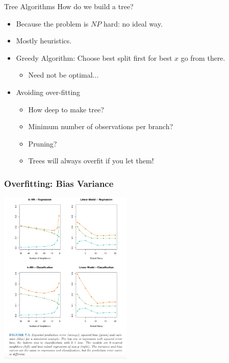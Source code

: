 \documentclass[xcolor=pdftex,dvipsnames,table,mathserif,aspectratio=169]{beamer}
\begin{document}
\begin{frame}{Tree Algorithms}
How do we build a tree?
\begin{itemize}
\item Because the problem is $NP$ hard: no ideal way.
\item Mostly heuristics.
\item Greedy Algorithm: Choose best split first for best $x$ go from there.
\begin{itemize}
\item Need not be optimal...
\end{itemize}
\item Avoiding \alert{over-fitting}
\begin{itemize}
\item How deep to make tree?
\item Minimum number of observations per branch?
\item Pruning?
\item Trees will always overfit if you let them!
\end{itemize}
\end{itemize}
\end{frame}


\begin{frame}
\frametitle{Overfitting: Bias Variance}
\includegraphics[width=2.5in]{./resources/bias-variance.png}
\end{frame}
\end{document}
